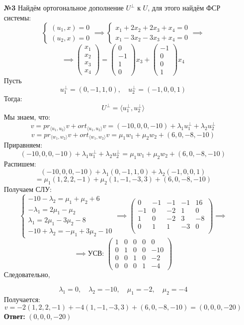 \documentclass[a4paper]{article}
\newcommand{\mat}[1]{\begin{pmatrix} #1 \end{pmatrix}}
\newcommand{\case}[1]{\begin{cases} #1 \end{cases}}
\begin{document}
\begin{enumerate}
    \item[\textbf{№3}]Найдём ортогональное дополнение $U^\perp$ к $U$, для этого найдём ФСР системы:
    $$\case{
        (u_1, x) = 0\\
        (u_2, x) = 0
    } \implies \case{
        x_1+2x_2 + 2x_3 + x_4 = 0\\
        x_1-3x_2-3x_3 + x_4 = 0
    }\implies$$
    $$ \implies \mat{x_1\\x_2\\x_3\\x_4} = \mat{0\\-1\\1\\0}x_3 + \mat{-1\\0\\0\\1}x_4$$
    Пусть
    $$u_1^\perp = (0, -1, 1, 0), \quad u_2^\perp = (-1, 0, 0, 1)$$
    Тогда:
    $$U^\perp = \langle u_1^\perp, u_2^\perp \rangle$$
    Мы знаем, что:
    $$v = pr_{\langle u_1, u_2 \rangle} v  + ort_{\langle u_1, u_2 \rangle} v = 
     (-10, 0, 0, -10)  + \lambda_1 u_1^\perp + \lambda_2 u_2^\perp $$
    $$v = pr_{\langle w_1, w_2 \rangle} v  + ort_{\langle w_1, w_2 \rangle} v = 
     \mu_1 w_1 + \mu_2 w_2 + (6, 0, -8, -10)$$
    Приравняем:
    $$(-10, 0, 0, -10)  + \lambda_1 u_1^\perp + \lambda_2 u_2^\perp  = \mu_1 w_1 + \mu_2 w_2 + (6, 0, -8, -10)$$
    Распишем:
    $$(-10, 0, 0, -10)  + \lambda_1 (0, -1, 1, 0) + \lambda_2 (-1, 0, 0, 1)  $$
    $$= \mu_1(1, 2, 2, -1) + \mu_2 (1, -1, -3, 3) + (6, 0, -8, -10)$$
    Получаем СЛУ:
    $$\begin{cases}
        -10 - \lambda_2 = \mu_1 + \mu_2 + 6 \\
        -\lambda_1 = 2\mu_1 - \mu_2 \\
        \lambda_1 = 2\mu_1 - 3\mu_2 - 8 \\
        -10 + \lambda_2 = -\mu_1 + 3\mu_2 - 10
        \end{cases} \implies \begin{pmatrix}
            0 & -1 & -1 & -1 & 16 \\
            -1 & 0 & -2 & 1 & 0 \\
            1 & 0 & -2 & 3 & -8 \\
            0 & 1 & 1 & -3 & 0 \\
            \end{pmatrix} \implies$$
    $$\implies\text{УСВ: } 
    \begin{pmatrix}
        1 & 0 & 0 & 0 & 0 \\
        0 & 1 & 0 & 0 & -10 \\
        0 & 0 & 1 & 0 & -2 \\
        0 & 0 & 0 & 1 & -4
        \end{pmatrix}
    $$
    Следовательно,
    
\[
    \lambda_1 = 0,\quad \lambda_2 = -10,\quad \mu_1 = -2,\quad \mu_2 = -4
    \]
    Получается:
    $$v = -2(1, 2, 2, -1) + -4 (1, -1, -3, 3) + (6, 0, -8, -10) = (0, 0, 0, -20)$$
    \textbf{Ответ: } $(0, 0, 0, -20)$

\end{enumerate}
\end{document}
